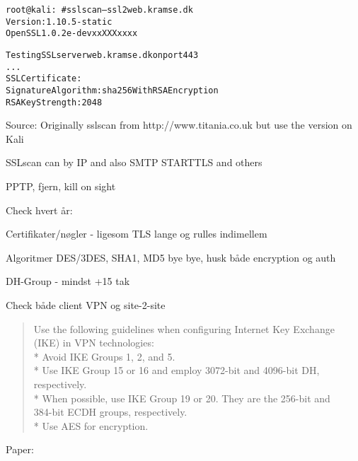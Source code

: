 \documentclass[Screen16to9,17pt]{foils}
\begin{document}

\begin{alltt}\small
root@kali:~# sslscan --ssl2 web.kramse.dk
Version: 1.10.5-static
OpenSSL 1.0.2e-dev xx XXX xxxx

Testing SSL server web.kramse.dk on port 443
...
  SSL Certificate:
Signature Algorithm: sha256WithRSAEncryption
RSA Key Strength:    2048
\end{alltt}

Source:
Originally sslscan from http://www.titania.co.uk
 but use the version on Kali

SSLscan can by IP and also SMTP STARTTLS and others





\begin{list1}
\item PPTP, fjern, kill on sight
\item Check hvert år:
\begin{list2}
\item Certifikater/nøgler - ligesom TLS lange og rulles indimellem
\item Algoritmer DES/3DES, SHA1, MD5 bye bye, husk både encryption og auth
\item DH-Group - mindst +15 tak
\item Check både client VPN og site-2-site
\end{list2}
\end{list1}


\begin{quote}
  Use the following guidelines when configuring Internet Key Exchange (IKE) in VPN technologies:\\
* Avoid IKE Groups 1, 2, and 5.\\
* Use IKE Group 15 or 16 and employ 3072-bit and 4096-bit DH, respectively.\\
* When possible, use IKE Group 19 or 20. They are the 256-bit and \\
384-bit ECDH groups, respectively.\\
* Use AES for encryption.
\end{quote}
Paper:\\
{\footnotesize {}}
\end{document}
